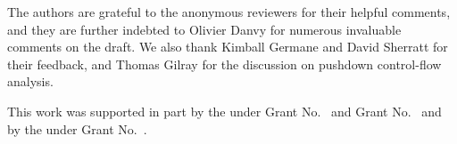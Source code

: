 \documentclass[acmsmall, review]{acmart}\settopmatter{}
\begin{document}
\begin{acks}                            %
  The authors are grateful to the anonymous reviewers for their 
  helpful comments, and they are further indebted to Olivier Danvy 
  for numerous invaluable comments on the draft. We also thank
  Kimball Germane and David Sherratt for their feedback, and
  Thomas Gilray for the discussion on pushdown control-flow analysis.

  This work was supported in part by the
   under Grant
  No.~ and Grant
  No.~ and by the
   under Grant
  No.~.  
\end{acks}




\end{document}
